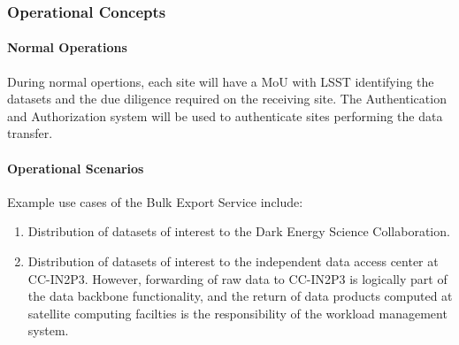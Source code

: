 \subsubsection{Operational Concepts}

\paragraph{Normal Operations}

During normal opertions, each site will have a MoU with LSST identifying the datasets and the due diligence required on the receiving site. The Authentication and Authorization system will be used to authenticate sites performing the data transfer.

\paragraph{Operational Scenarios}

Example use cases of the Bulk Export Service include:

\begin{enumerate}

\item Distribution of datasets of interest to the Dark Energy Science Collaboration.

\item Distribution of datasets of interest to the independent data access center at CC-IN2P3. However, forwarding of raw data to CC-IN2P3 is logically part of the data backbone functionality, and the return of data products computed at satellite computing facilties is the responsibility of the workload management system.

\end{enumerate}
